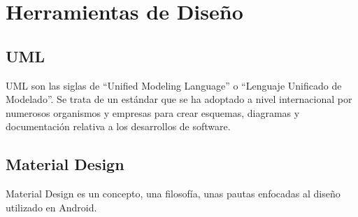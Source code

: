 \section{Herramientas de Diseño}

\subsection{UML}
UML son las siglas de “Unified Modeling Language” o “Lenguaje Unificado de Modelado”. Se trata de un estándar que se ha adoptado a nivel internacional por numerosos organismos y empresas para crear esquemas, diagramas y documentación relativa a los desarrollos de software.

\subsection{Material Design}
Material Design es un concepto, una filosofía, unas pautas enfocadas al diseño utilizado en Android.
